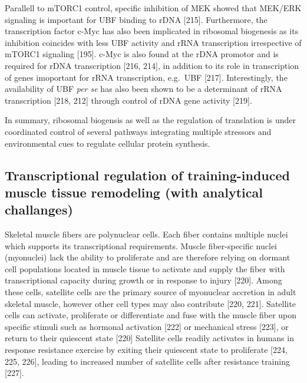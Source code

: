 \documentclass[twoside,10pt]{gihclass} %
\begin{document}
Parallell to mTORC1 control, specific inhibition of MEK showed that MEK/ERK signaling is important for UBF binding to rDNA
{[}215{]}.
Furthermore, the transcription factor c-Myc has also been implicated in ribosomal biogenesis as its inhibition coincides with less UBF activity and rRNA transcription irrespective of mTORC1 signaling
{[}195{]}.
c-Myc is also found at the rDNA promotor and is required for rDNA transcription
{[}216, 214{]},
in addition to its role in transcription of genes imoportant for rRNA transcription, e.g.~UBF
{[}217{]}.
Interestingly, the availability of UBF \emph{per se} has also been shown to be a determinant of rRNA transcription
{[}218, 212{]}
through control of rDNA gene activity
{[}219{]}.

In summary, ribosomal biogensis as well as the regulation of translation is under coordinated control of several pathways integrating multiple stressors and environmental cues to regulate cellular protein synthesis.

\hypertarget{transcriptional-regulation-of-training-induced-muscle-tissue-remodeling-with-analytical-challanges}{%
\subsection{Transcriptional regulation of training-induced muscle tissue remodeling (with analytical challanges)}\label{transcriptional-regulation-of-training-induced-muscle-tissue-remodeling-with-analytical-challanges}}

Skeletal muscle fibers are polynuclear cells. Each fiber contains multiple nuclei which supports its transcriptional requirements. Muscle fiber-specific nuclei (myonuclei) lack the ability to proliferate and are therefore relying on dormant cell populations located in muscle tissue to activate and supply the fiber with transcriptional capacity during growth or in response to injury
{[}220{]}.
Among these cells, satellite cells are the primary source of myonuclear accretion in adult skeletal muscle, however other cell types may also contribute
{[}220, 221{]}.
Satellite cells can activate, proliferate or differentiate and fuse with the muscle fiber upon specific stimuli such as hormonal activation
{[}222{]}
or mechanical stress
{[}223{]},
or return to their quiescent state
{[}220{]}
Satellite cells readily activates in humans in response resistance exercise by exiting their quiescent state to proliferate
{[}224, 225, 226{]},
leading to increased number of satellite cells after resistance training
{[}227{]}.
\end{document}
